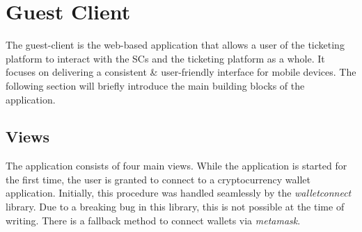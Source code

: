 
\section{Guest Client}\label{section:guest client}
The guest-client is the web-based application that allows a user of the ticketing platform to interact with the SCs and the ticketing platform as a whole. It focuses on delivering a consistent \& user-friendly interface for mobile devices. The following section will briefly introduce the main building blocks of the application.

\subsection{Views}

The application consists of four main views. While the application is started for the first time, the user is granted to connect to a cryptocurrency wallet application. Initially, this procedure was handled seamlessly by the \textit{walletconnect} library. Due to a breaking bug in this library, this is not possible at the time of writing. There is a fallback method to connect wallets via \textit{metamask}.

